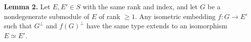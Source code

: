 \textbf{Lemma 2.} Let $E, E' \in S$ with the same rank and index, and let $G$ be a nondegenerate submodule of $E$ of rank $\geq 1$. Any isometric embedding $f: G \to E'$ such that $G^\perp$ and $f(G)^\perp$ have the same type extends to an isomorphism $E \simeq E'$.
